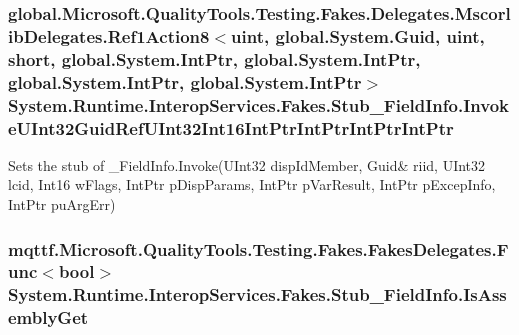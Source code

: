\hypertarget{class_system_1_1_runtime_1_1_interop_services_1_1_fakes_1_1_stub___field_info_a998f29deca8e5b221df9fb69d0bc66cf}{
\subsubsection[{Invoke\-U\-Int32\-Guid\-Ref\-U\-Int32\-Int16\-Int\-Ptr\-Int\-Ptr\-Int\-Ptr\-Int\-Ptr}]{\setlength{\rightskip}{0pt plus 5cm}global.\-Microsoft.\-Quality\-Tools.\-Testing.\-Fakes.\-Delegates.\-Mscorlib\-Delegates.\-Ref1\-Action8$<$uint, global.\-System.\-Guid, uint, short, global.\-System.\-Int\-Ptr, global.\-System.\-Int\-Ptr, global.\-System.\-Int\-Ptr, global.\-System.\-Int\-Ptr$>$ System.\-Runtime.\-Interop\-Services.\-Fakes.\-Stub\-\_\-\-Field\-Info.\-Invoke\-U\-Int32\-Guid\-Ref\-U\-Int32\-Int16\-Int\-Ptr\-Int\-Ptr\-Int\-Ptr\-Int\-Ptr}}\label{class_system_1_1_runtime_1_1_interop_services_1_1_fakes_1_1_stub___field_info_a998f29deca8e5b221df9fb69d0bc66cf}


Sets the stub of \-\_\-\-Field\-Info.\-Invoke(U\-Int32 disp\-Id\-Member, Guid\& riid, U\-Int32 lcid, Int16 w\-Flags, Int\-Ptr p\-Disp\-Params, Int\-Ptr p\-Var\-Result, Int\-Ptr p\-Excep\-Info, Int\-Ptr pu\-Arg\-Err)

\hypertarget{class_system_1_1_runtime_1_1_interop_services_1_1_fakes_1_1_stub___field_info_add236e91de9e185ad7f54ccf6b784ee2}{
\subsubsection[{Is\-Assembly\-Get}]{\setlength{\rightskip}{0pt plus 5cm}mqttf.\-Microsoft.\-Quality\-Tools.\-Testing.\-Fakes.\-Fakes\-Delegates.\-Func$<$bool$>$ System.\-Runtime.\-Interop\-Services.\-Fakes.\-Stub\-\_\-\-Field\-Info.\-Is\-Assembly\-Get}}\label{class_system_1_1_runtime_1_1_interop_services_1_1_fakes_1_1_stub___field_info_add236e91de9e185ad7f54ccf6b784ee2}


